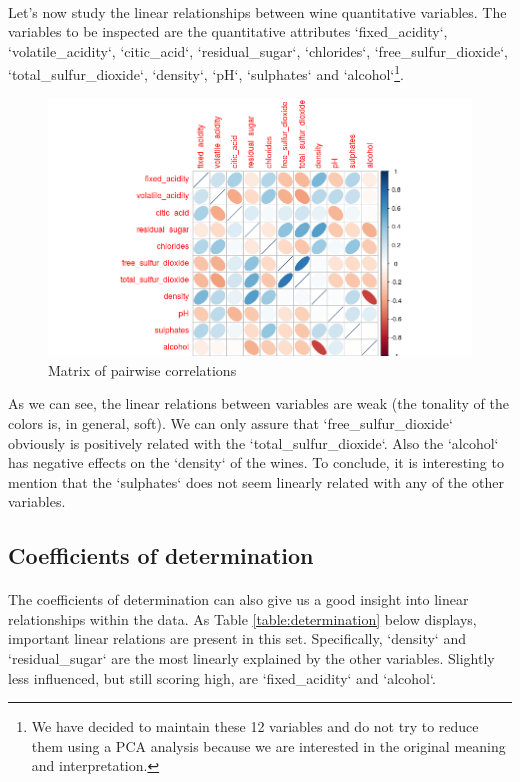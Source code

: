 \documentclass[10pt]{article}
\begin{document}
\paragraph*{}
Let's now study the linear relationships between wine quantitative variables. The variables to be inspected are the quantitative attributes `fixed\_acidity`, `volatile\_acidity`, `citic\_acid`, `residual\_sugar`, `chlorides`, `free\_sulfur\_dioxide`, `total\_sulfur\_dioxide`, `density`, `pH`, `sulphates` and `alcohol`\footnote{We have decided to maintain these 12 variables and do not try to reduce them using a PCA analysis because we are interested in the original meaning and interpretation.}. 

\begin{figure}[H]
	\centering
	\includegraphics[width=5.2in]{figures/correlations.png}
	\caption{Matrix of pairwise correlations} 
	\label{figure:correlationsy}
\end{figure}

As we can see, the linear relations between variables are weak (the tonality of the colors is, in general, soft). We can only assure that `free\_sulfur\_dioxide` obviously is positively related with the `total\_sulfur\_dioxide`. Also the `alcohol` has negative effects on the `density` of the wines. To conclude, it is interesting to mention that the `sulphates` does not seem linearly related with any of the other variables. 

\subsection{Coefficients of determination}
\paragraph*{}
The coefficients of determination can also give us a good insight into linear relationships within the data. As Table \ref{table:determination} below displays, important linear relations are present in this set. Specifically, `density` and `residual\_sugar` are the most linearly explained by the other variables. Slightly less influenced, but still scoring high, are `fixed\_acidity` and `alcohol`.
\end{document}
